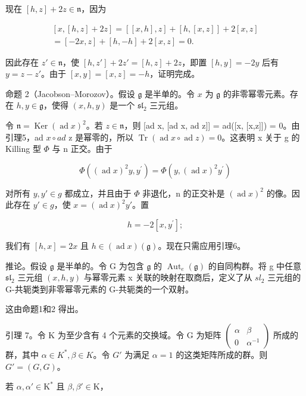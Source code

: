 现在 \([h,z] + 2z\in \mathfrak{n}\)，因为

\[
\begin{array}{r} [ x, [ h, z ] + 2 z ] = [ [ x, h ], z ] + [ h, [ x, z ] ] + 2 [ x, z ] \\ = [ - 2 x, z ] + [ h, - h ] + 2 [ x, z ] = 0. \end{array}
\]

因此存在 \(z' \in \mathfrak{n}\)，使 \([h, z'] + 2z' = [h, z] + 2z\)，即置 \([h, y] = -2y\) 后有 \(y = z - z'\)。由于 \([x, y] = [x, z] = -h\)，证明完成。

命题 2（Jacobson–Morozov）。假设 \(\mathfrak{g}\) 是半单的。令 \(x\) 为 \(\mathfrak{g}\) 的非零幂零元素。存在 \(h, y \in \mathfrak{g}\)，使得 \((x, h, y)\) 是一个 \(\mathfrak{sl}_2\) 三元组。

令 \(\mathfrak{n}=\operatorname{Ker}(\operatorname{ad}x)^{2}\)。若 \(z\in\mathfrak{n}\)，则 {[}ad x, {[}ad x, ad z{]}{]} = ad({[}x, {[}x,z{]}{]}) = 0。由引理5，ad \(x\circ ad\) z 是幂零的，所以 \(\operatorname{Tr}(\operatorname{ad}x\circ\operatorname{ad}z)=0\)。这表明 x 关于 g 的 Killing 型 \(\Phi\) 与 n 正交。由于

\[
\Phi ((\operatorname{ad} x) ^ {2} y, y ^ {\prime}) = \Phi (y, (\operatorname{ad} x) ^ {2} y ^ {\prime})
\]

对所有 \(y, y' \in g\) 都成立，并且由于 \(\Phi\) 非退化，n 的正交补是 \((\operatorname{ad} x)^{2}\) 的像。因此存在 \(y' \in g\)，使 \(x = (\operatorname{ad} x)^{2}y'\)。置

\[
h = - 2 [ x, y ^ {\prime} ];
\]

我们有 \([h,x]=2x\) 且 \(h\in(\operatorname{ad}x)(\mathfrak{g})\)。现在只需应用引理6。

推论。假设 \(\mathfrak{g}\) 是半单的。令 \(\mathrm{G}\) 为包含 \(\mathfrak{g}\) 的 \(\operatorname{Aut}_e(\mathfrak{g})\) 的自同构群。将 g 中任意 \(\mathfrak{sl}_2\) 三元组 \((x,h,y)\) 与幂零元素 x 关联的映射在取商后，定义了从 \(sl_{2}\) 三元组的 G-共轭类到非零幂零元素的 G-共轭类的一个双射。

这由命题1和2 得出。

引理 7。令 K 为至少含有 4 个元素的交换域。令 G 为矩阵 \(\begin{pmatrix}\alpha&\beta\\0&\alpha^{-1}\end{pmatrix}\) 所成的群，其中 \(\alpha\in K^{*},\beta\in K\)。令 \(G'\) 为满足 \(\alpha=1\) 的这类矩阵所成的群。则 \(G'=(G,G)\)。

若 \(\alpha, \alpha' \in \mathrm{K}^*\) 且 \(\beta, \beta' \in \mathrm{K}\)，


